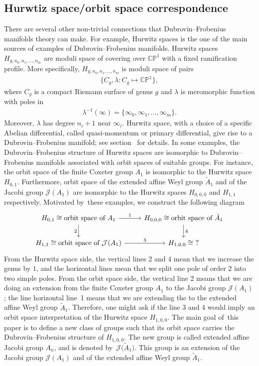 \documentclass[pdftex]{sigma}%
\numberwithin{equation}{section}
\newcommand{\Ja}{\mathcal{J}}
\begin{document}
\subsection{Hurwtiz space/orbit space correspondence}
There are several other non-trivial connections that Dubrovin--Frobenius manifolds theory can make. For example, Hurwitz spaces is the one of the main sources of examples of Dubrovin--Frobenius manifolds. Hurwitz spaces $H_{g,n_0,n_1,\dots,n_m}$ are moduli space of covering over $\mathbb{CP}^1$ with a fixed ramification profile. More specifically, $H_{g,n_0,n_1,\dots,n_m}$ is moduli space of pairs
\begin{gather*}
\big\{C_g ,\lambda\colon C_g\mapsto \mathbb{CP}^1\big\},
\end{gather*}
where $C_g$ is a compact Riemann surface of genus $g$ and $\lambda$ is meromorphic function with poles in
\begin{gather*}
\lambda^{-1}(\infty)=\{\infty_0,\infty_1,\dots,\infty_{m} \}.
\end{gather*}
 Moreover, $\lambda$ has degree $n_i+1$ near $\infty_i$. Hurwitz space, with a choice of a specific Abelian differential, called quasi-momentum or primary differential, give rise to a Dubrovin--Frobenius manifold; see section~\cite{B.Dubrovin2, V.Shramchenko} for details. In some examples, the Dubrovin--Frobenius structure of Hurwitz spaces are isomorphic to Dubrovin--Frobenius manifolds associated with orbit spaces of suitable groups. For instance, the orbit space of the finite Coxeter group $A_1$ is isomorphic to the Hurwitz space $H_{0,1}$. Furthermore, orbit space of the extended affine Weyl group $\tilde A_1$ and of the Jacobi group $\Ja(A_1)$ are isomorphic to the Hurwitz spaces $H_{0,0,0}$ and $H_{1,1}$ respectively. Motivated by~these examples, we construct the following diagram
\[
 \begin{tikzcd}
 H_{0,1}\cong \text{orbit space of $A_1$} \arrow{r}{1} \arrow[swap]{d}{2} & H_{0,0,0}\cong \text{orbit space of $\tilde A_1$} \arrow{d}{4} \\%
H_{1,1}\cong \text{orbit space of $\Ja(A_1)$} \arrow{r}{3}& H_{1,0,0}\cong\ ?
 \end{tikzcd}
\]
From the Hurwitz space side, the vertical lines 2 and 4 mean that we increase the genus by $1$, and the horizontal lines mean that we split one pole of order $2$ into two simple poles. From the orbit space side, the vertical line 2 means that we are doing an extension from the finite Coxeter group $A_1$ to the Jacobi group $\Ja(A_1)$; the line horizontal line~1 means that we are extending the  to the extended affine Weyl group $\tilde A_1$. Therefore, one might ask if the line 3 and 4 would imply an orbit space interpretation of the Hurwitz space $H_{1,0,0}$. The main goal of~this paper is to define a new class of groups such that its orbit space carries the Dubrovin--Frobenius structure of $H_{1,0,0}$. The new group is called extended affine Jacobi group $A_n$, and is denoted by~$\Ja\big(\tilde A_1\big)$. This group is an extension of the Jacobi group $\Ja(A_1)$ and of the extended affine Weyl group $\tilde A_1$.
\end{document}
